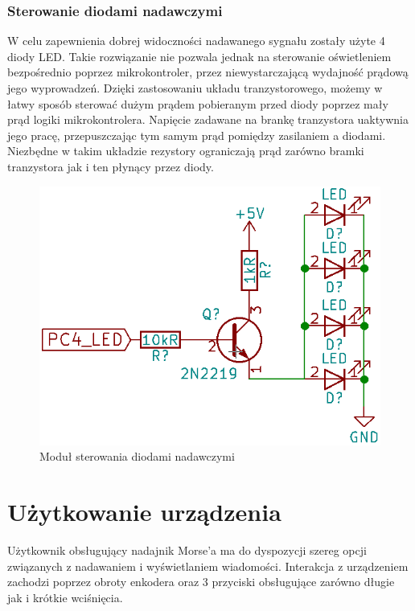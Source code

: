 \documentclass{article}
\begin{document}
\newpage
\subsubsection{Sterowanie diodami nadawczymi}
W celu zapewnienia dobrej widoczności nadawanego sygnału zostały użyte 4 diody LED. Takie rozwiązanie nie pozwala jednak na sterowanie oświetleniem bezpośrednio poprzez mikrokontroler, przez niewystarczającą wydajność prądową jego wyprowadzeń. Dzięki zastosowaniu układu tranzystorowego, możemy w łatwy sposób sterować dużym prądem pobieranym przed diody poprzez mały prąd logiki mikrokontrolera. Napięcie zadawane na brankę tranzystora uaktywnia jego pracę, przepuszczając tym samym prąd pomiędzy zasilaniem a diodami. Niezbędne w takim układzie rezystory ograniczają prąd zarówno bramki tranzystora jak i ten płynący przez diody. 

\begin{figure}[h!]
	\center
	\includegraphics[scale=0.3]{img/sterowanie_diodami.png}
	\caption{Moduł sterowania diodami nadawczymi}
	\label{fig:zdjecie3}
\end{figure}

\section{Użytkowanie urządzenia}
Użytkownik obsługujący nadajnik Morse'a ma do dyspozycji szereg opcji związanych z nadawaniem i wyświetlaniem wiadomości. Interakcja z urządzeniem zachodzi poprzez obroty enkodera oraz 3 przyciski obsługujące zarówno długie jak i krótkie wciśnięcia.
\end{document}
